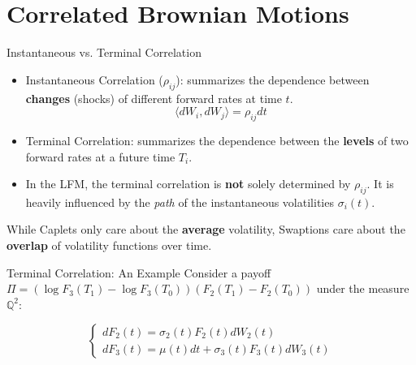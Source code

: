 \documentclass{beamer}
\begin{document}
\section{Correlated Brownian Motions}

\begin{frame}{Instantaneous vs. Terminal Correlation}
	\begin{itemize}
		\item<1-> Instantaneous Correlation ($\rho_{ij}$): summarizes the dependence between \textbf{changes} (shocks) of different forward rates at time $t$.
		\begin{equation*}
			\langle dW_i, dW_j \rangle = \rho_{ij} dt
		\end{equation*}
		\item<2-> Terminal Correlation: summarizes the dependence between the \textbf{levels} of two forward rates at a future time $T_i$.
		\item<3-> In the LFM, the terminal correlation is \textbf{not} solely determined by $\rho_{ij}$. It is heavily influenced by the \textit{path} of the instantaneous volatilities $\sigma_i(t)$.
	\end{itemize}
	 {
		\begin{tcolorbox}[colback=gray!5, colframe=maincolor, arc=0mm, boxrule=0.5pt]
			\footnotesize
			While Caplets only care about the \textbf{average} volatility, Swaptions care about the \textbf{overlap} of volatility functions over time.
		\end{tcolorbox}
	}
\end{frame}

\begin{frame}{Terminal Correlation: An Example}
	Consider a payoff $\Pi = (\log F_3(T_1) - \log F_3(T_0))(F_2(T_1) - F_2(T_0))$ under the measure $\mathbb{Q}^2$:
	
	\begin{equation*}
		\begin{cases}
			dF_2(t) = \sigma_{2}(t)F_2(t)dW_2(t) \\
			dF_3(t) = \mu(t)dt + \sigma_{3}(t)F_3(t)dW_3(t)
		\end{cases}
	\end{equation*}
	
\end{frame}
\end{document}
